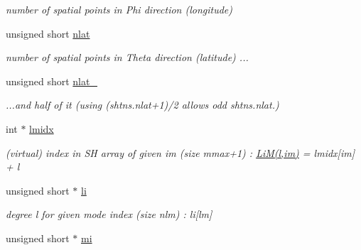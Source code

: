 \begin{DoxyCompactItemize}
\begin{DoxyCompactList}\small\item\em number of spatial points in Phi direction (longitude) \end{DoxyCompactList}\item 
\hypertarget{structshtns__info_a12475937302f111720d59b8b11424215}{}unsigned short \hyperlink{structshtns__info_a12475937302f111720d59b8b11424215}{nlat}\label{structshtns__info_a12475937302f111720d59b8b11424215}

\begin{DoxyCompactList}\small\item\em number of spatial points in Theta direction (latitude) ... \end{DoxyCompactList}\item 
\hypertarget{structshtns__info_ae333643489525b49fd066ba7bb638696}{}unsigned short \hyperlink{structshtns__info_ae333643489525b49fd066ba7bb638696}{nlat\+\_}\label{structshtns__info_ae333643489525b49fd066ba7bb638696}

\begin{DoxyCompactList}\small\item\em ...and half of it (using (shtns.\+nlat+1)/2 allows odd shtns.\+nlat.) \end{DoxyCompactList}\item 
\hypertarget{structshtns__info_ad14521718bc234a2197e2d7bb91e0e81}{}int $\ast$ \hyperlink{structshtns__info_ad14521718bc234a2197e2d7bb91e0e81}{lmidx}\label{structshtns__info_ad14521718bc234a2197e2d7bb91e0e81}

\begin{DoxyCompactList}\small\item\em (virtual) index in S\+H array of given im (size mmax+1) \+: \hyperlink{shtns_8h_aee0d42089971d399238da3aaca4d9ca1}{Li\+M(l,im)} = lmidx\mbox{[}im\mbox{]} + l \end{DoxyCompactList}\item 
\hypertarget{structshtns__info_ae51719912d1a0c6ce672441e9931a574}{}unsigned short $\ast$ \hyperlink{structshtns__info_ae51719912d1a0c6ce672441e9931a574}{li}\label{structshtns__info_ae51719912d1a0c6ce672441e9931a574}

\begin{DoxyCompactList}\small\item\em degree l for given mode index (size nlm) \+: li\mbox{[}lm\mbox{]} \end{DoxyCompactList}\item 
\hypertarget{structshtns__info_a296b42387b5b60f6f4873a7024cd0d5d}{}unsigned short $\ast$ \hyperlink{structshtns__info_a296b42387b5b60f6f4873a7024cd0d5d}{mi}\label{structshtns__info_a296b42387b5b60f6f4873a7024cd0d5d}


\end{DoxyCompactItemize}
